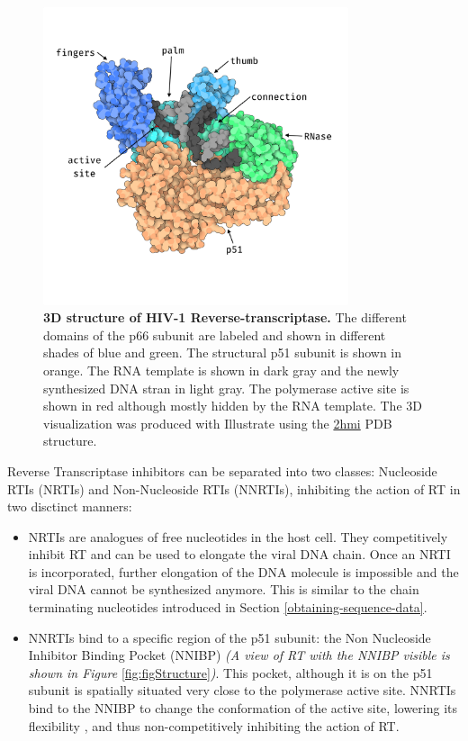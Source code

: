 \documentclass[
  11pt,
  twoside,
  BCOR=10mm,
  listof=totoc]{scrbook}
\newcommand{\extcaption}[2]{
    \caption[#1]{
        \textbf{#1}\newline
        #2
    }
}
\begin{document}
\begin{figure} 
  \centering 
  \includegraphics[width=0.8\textwidth]{./figures/HIV-Intro/rt.png}      \extcaption{3D structure of HIV-1 Reverse-transcriptase.}{The different domains of the p66 subunit are labeled and shown in different shades of blue and green. The structural p51 subunit is shown in orange. The RNA template is shown in dark gray and the newly synthesized DNA stran in light gray. The polymerase active site is shown in red although mostly hidden by the RNA template. The 3D visualization was produced with Illustrate \autocite{goodsellIllustrateSoftwareBiomolecular2019} using the \href{https://www.rcsb.org/structure/2HMI}{2hmi} PDB structure.}       
  \label{fig:rtStruct} 
\end{figure}

Reverse Transcriptase inhibitors can be separated into two classes: Nucleoside RTIs (NRTIs) and Non-Nucleoside RTIs (NNRTIs), inhibiting the action of RT in two disctinct manners:

\begin{itemize}
\item
  NRTIs are analogues of free nucleotides in the host cell. They competitively inhibit RT and can be used to elongate the viral DNA chain. Once an NRTI is incorporated, further elongation of the DNA molecule is impossible and the viral DNA cannot be synthesized anymore. This is similar to the chain terminating nucleotides introduced in Section \ref{obtaining-sequence-data}.
\item
  NNRTIs bind to a specific region of the p51 subunit: the Non Nucleoside Inhibitor Binding Pocket (NNIBP) \emph{(A view of RT with the NNIBP visible is shown in Figure} \ref{fig:figStructure}\emph{)}. This pocket, although it is on the p51 subunit is spatially situated very close to the polymerase active site. NNRTIs bind to the NNIBP to change the conformation of the active site, lowering its flexibility \autocite{esnoufUniqueFeaturesStructure1997}, and thus non-competitively inhibiting the action of RT.
\end{itemize}
\end{document}
